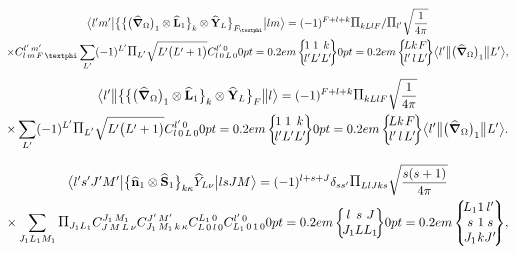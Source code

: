 \begin{multline}
\braOket{ l^{\prime} m^{\prime}}{\bigl\{\bigl\{\bigl(\delop_{\Omega}\bigr)_{1} \otimes \widehat{\vect{L}}_{1}\bigr\}_{k} \otimes \widehat{\vect{Y}}_{L}\bigr\}_{F_{\varphi}}}{l m}=(-1)^{F+l+k} \Fact{k L l F}/\Fact{l^\prime}\sqrt{\frac{1}{4 \pi}} \\
 \times 
\clebsch{l}{m}{F}{\varphi}{l^{\prime}}{m^{\prime}} \sum_{L^{\prime}}(-1)^{L^{\prime}} \Fact{L^{\prime}}\sqrt{L^{\prime}\bigl(L^{\prime}+1\bigr)}
\clebsch{l}{0}{L}{0}{l^{\prime}}{0}
\sixj{1}{1}{k}{l^{\prime}}{L^{\prime}}{L^{\prime}}
\sixj{L}{k}{F}{l^{\prime}}{l}{L^{\prime}}
\braOketred{ l^{\prime}}{\bigl(\delop_{\Omega}\bigr)_{1}}{ L^{\prime}},  \label{eq:13:2:133}
\end{multline}
\begin{multline*}
\braOketred{ l^{\prime}}{\bigl\{\bigl\{\bigl(\delop_{\Omega}\bigr)_{1} \otimes \widehat{\vect{L}}_{1}\bigr\}_{k} \otimes \widehat{\vect{Y}}_{L}\bigr\}_{F}}{ l}=(-1)^{F+l+k} \Fact{k L l F}\sqrt{\frac{1}{4 \pi}} \\
\times \sum_{L^{\prime}}(-1)^{L^{\prime}} \Fact{L^{\prime}}\sqrt{L^{\prime}\bigl(L^{\prime}+1\bigr)}
\clebsch{l}{0}{L}{0}{l^{\prime}}{0}
\sixj{1}{1}{k}{l^{\prime}}{L^{\prime}}{L^{\prime}}
\sixj{L}{k}{F}{l^{\prime}}{l}{L^{\prime}}
\braOketred{ l^{\prime}}{\bigl(\delop_{\Omega}\bigr)_{1}}{ L^{\prime}}.
\end{multline*}

\begin{multline}
\braOket{ l^{\prime} s^{\prime} J^{\prime} M^{\prime}}{\bigl\{\widehat{\vect{n}}_{1} \otimes \widehat{\vect{S}}_{1}\bigr\}_{k \kappa} \widehat{Y}_{L \nu}}{l s J M}=(-1)^{l+s+J} \delta_{s s^{\prime}} \Fact{L l J k s}\sqrt{\frac{s(s+1)}{4 \pi}} \\
 \times \sum_{J_{1} L_{1} M_{1}} \Fact{J_1 L_1} 
\clebsch{J}{M}{L}{\nu}{J_{1}}{M_{1}} 
\clebsch{J_{1}}{M_{1}}{k}{\kappa}{J^{\prime}}{M^{\prime}} 
\clebsch{L}{0}{l}{0}{L_{1}}{0} 
\clebsch{L_{1}}{0}{1}{0}{l^{\prime}}{0}
\sixj{l}{s}{J}{J_{1}}{L}{L_{1}}
\ninej{L_{1}}{1}{l^{\prime}}{s}{1}{s}{J_{1}}{k}{J^{\prime}},  \label{eq:13:2:134}
\end{multline}

